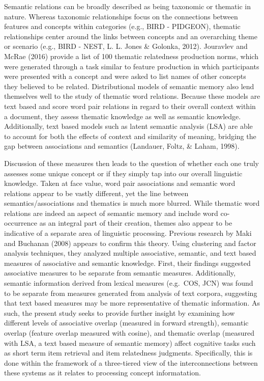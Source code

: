 \documentclass[english,man]{apa6}
\theoremstyle{definition}
\theoremstyle{definition}
\theoremstyle{remark}
\begin{document}
Semantic relations can be broadly described as being taxonomic or
thematic in nature. Whereas taxonomic relationships focus on the
connections between features and concepts within categories (e.g., BIRD
- PIDGEON), thematic relationships center around the links between
concepts and an overarching theme or scenario (e.g., BIRD - NEST, L. L.
Jones \& Golonka, 2012). Jouravlev and McRae (2016) provide a list of
100 thematic relatedness production norms, which were generated through
a task similar to feature production in which participants were
presented with a concept and were asked to list names of other concepts
they believed to be related. Distributional models of semantic memory
also lend themselves well to the study of thematic word relations.
Because these models are text based and score word pair relations in
regard to their overall context within a document, they assess thematic
knowledge as well as semantic knowledge. Additionally, text based models
such as latent semantic analysis (LSA) are able to account for both the
effects of context and similarity of meaning, bridging the gap between
associations and semantics (Landauer, Foltz, \& Laham, 1998).

Discussion of these measures then leads to the question of whether each
one truly assesses some unique concept or if they simply tap into our
overall linguistic knowledge. Taken at face value, word pair
associations and semantic word relations appear to be vastly different,
yet the line between semantics/associations and thematics is much more
blurred. While thematic word relations are indeed an aspect of semantic
memory and include word co-occurrence as an integral part of their
creation, themes also appear to be indicative of a separate area of
linguistic processing. Previous research by Maki and Buchanan (2008)
appears to confirm this theory. Using clustering and factor analysis
techniques, they analyzed multiple associative, semantic, and text based
measures of associative and semantic knowledge. First, their findings
suggested associative measures to be separate from semantic measures.
Additionally, semantic information derived from lexical measures
(e.g.~COS, JCN) was found to be separate from measures generated from
analysis of text corpora, suggesting that text based measures may be
more representative of thematic information. As such, the present study
seeks to provide further insight by examining how different levels of
associative overlap (measured in forward strength), semantic overlap
(feature overlap measured with cosine), and thematic overlap (measured
with LSA, a text based measure of semantic memory) affect cognitive
tasks such as short term item retrieval and item relatedness judgments.
Specifically, this is done within the framework of a three-tiered view
of the interconnections between these systems as it relates to
processing concept informatation.
\end{document}
